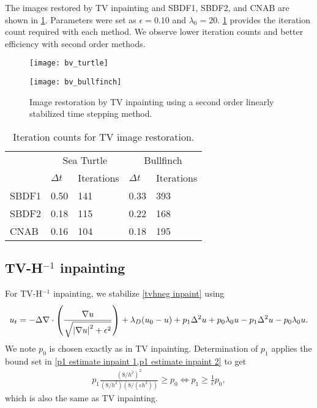 The images restored by TV inpainting and SBDF1, SBDF2, and CNAB are shown in \cref{fig:bv inpainting}. Parameters were set as $\epsilon=0.10$ and $\lambda_0=20$. \cref{tab:bv iter counts} provides the iteration count required with each method. We observe lower iteration counts and better efficiency with second order methods.
\begin{figure}[htb!]
\centering
\begin{minipage}{0.65\textwidth}
	\texttt{[image: bv\_turtle]}
\end{minipage}
\begin{minipage}{0.65\textwidth}
	\texttt{[image: bv\_bullfinch]}
\end{minipage}
\caption[Image restoration by TV inpainting.]{Image restoration by TV inpainting using a second order linearly stabilized time stepping method.}
\label{fig:bv inpainting}
\end{figure}


\begin{table}[htb!]
\caption[Iteration counts for TV image restoration.]{Iteration counts for TV image restoration.}
        \centering\begin{tabular}{lll ll} \toprule[1.25pt]
& \multicolumn{2}{c}{Sea Turtle} & \multicolumn{2}{c}{Bullfinch}
\\
& $\Delta t$ & Iterations & $\Delta t$ & Iterations
\\ \midrule
SBDF1 & 0.50 & 141 & 0.33 & 393 
\\
SBDF2& 0.18 & 115 & 0.22 & 168
\\             
CNAB &  0.16 & 104 & 0.18 & 195
\\ \bottomrule[1.25pt]
\end{tabular}
\label{tab:bv iter counts}
\end{table}

\subsection{TV-H\texorpdfstring{$^{-1}$}{-1} inpainting}
For TV-H$^{-1}$ inpainting, we stabilize \cref{tvhneg inpaint} using
\begin{align}
        u_t = -\Delta \nabla \cdot \left(\frac{\nabla u}{\sqrt{\left|\nabla u\right|^2 + \epsilon^2}} \right) + \lambda_D(u_0 - u)  + p_1\Delta^2 u + p_0\lambda_0 u - p_1\Delta^2 u - p_0\lambda_0 u.
\label{tvhneg stabilized}
\end{align}
We note $p_0$ is chosen exactly as in TV inpainting. Determination of $p_1$ applies the bound set in \cref{p1 estimate inpaint 1,p1 estimate inpaint 2} to get 
\begin{align}
        p_1\frac{(8/h^2)^2}{(8/h^2)(8/(\epsilon h^2))} \geq p_0 
\iff p_1 \geq \frac{1}{\epsilon}p_0,
\end{align}
which is also the same as TV inpainting.

